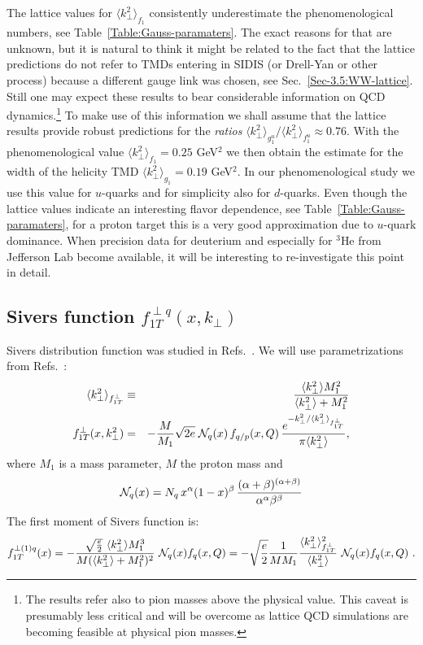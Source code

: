\documentclass[a4paper,11pt]{article}
\newcommand{\ba}{\begin{eqnarray}}
\newcommand{\ea}{\end{eqnarray}}
\newcommand{\la}{\langle}
\newcommand{\ra}{\rangle}
\def\kperp{k_\perp}
\def\avkperp{\la \kperp^2 \ra}
\begin{document}
The lattice values for $\langle \kperp^2 \rangle_{f_1}$ consistently 
underestimate the phenomenological numbers, see 
Table~\ref{Table:Gauss-paramaters}.
The exact reasons for that are unknown, but it is natural to think it
might be related to the fact that the lattice predictions \cite{Hagler:2009mb}
do not refer to TMDs entering in SIDIS (or Drell-Yan or other process) 
because a different gauge link was chosen, see Sec.~\ref{Sec-3.5:WW-lattice}. 
Still one may expect these results to bear considerable information 
on QCD dynamics.\footnote{
	The results \cite{Hagler:2009mb} refer also to pion masses above the 
	physical value. This caveat is presumably less critical and
	will be overcome as lattice QCD simulations are becoming feasible 
	at physical pion masses.}
To make use of this information we shall assume that the lattice results
\cite{Hagler:2009mb} provide robust predictions for the {\it ratios}
$\langle \kperp^2 \rangle_{g_1^u}/\langle \kperp^2 \rangle_{f_1^u}\approx 0.76$.
With the phenomenological value $\langle \kperp^2 \rangle_{f_1} = 0.25$ GeV$^2$ 
we then obtain the estimate for the width of the helicity TMD
$\langle \kperp^2 \rangle_{g_1} = 0.19$ GeV$^2$.
In our phenomenological study we use this value for $u$-quarks and for 
simplicity also for $d$-quarks. Even though the lattice values indicate 
an interesting flavor dependence, see Table~\ref{Table:Gauss-paramaters},
for a proton target this is a very good approximation due to $u$-quark 
dominance. When precision data for deuterium and especially for $^3$He
from Jefferson Lab become available, it will be interesting to 
re-investigate this point in detail.

\subsection{\boldmath Sivers function $f_{1T}^{\perp q}(x,k_\perp)$}
\label{App:basis-f1Tperp}

Sivers distribution function was studied in Refs.~\cite{Efremov:2004tp,Anselmino:2008sga,Anselmino:2011gs,Anselmino:2011ch, Aybat:2011ge,Gamberg:2013kla,Bacchetta:2011gx,Anselmino:2012aa,Sun:2013dya,Echevarria:2014xaa}. 
We will use parametrizations from  Refs.~\cite{Anselmino:2008sga,Anselmino:2011gs,Anselmino:2011ch}:
\ba
 \avkperp_{f_{1T}^\perp} &\equiv& \frac{\avkperp M_1^2}{\avkperp + M_1^2} \\
f_{1T}^{\perp}(x, \kperp^2)& =& - \frac {M}{M_1} \sqrt{2e} \;
{\cal N}_q(x) \, f_{q/p} (x,Q) \, \frac{e^{-\kperp^2/{\avkperp_{f_{1T}^\perp}}}}{\pi \avkperp} ,
\label{fiTp}
\ea
%
where $M_1$ is a mass parameter, $M$ the proton mass and
%
\ba
{\cal N}_q(x)= N_q \, x^{\alpha} (1-x)^{\beta} \,
\frac{(\alpha + \beta)^{(\alpha +\beta)}}
{\alpha^{\alpha} \beta^{\beta}}
 \ea
The first moment of Sivers function is:
\ba
f_{1T}^{\perp (1) q}(x)  = -\frac{\sqrt{\frac{e}{2}} \ \avkperp M_1^3}{M (\avkperp + M_1^2)^2}  \ {\cal N}_q(x)  f_q(x, Q) = -\sqrt{\frac{e}{2}} \frac{1}{M M_1}  \frac{\avkperp_{f_{1T}^\perp}^2}{\avkperp}    \ {\cal N}_q(x)  f_q(x, Q)
\label{siversm} \ .
\ea
\end{document}
